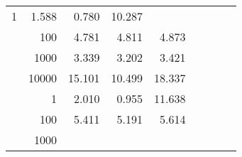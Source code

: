 \begin{table}
\begin{tabular}{rrrrrrrrr}
					\multirow{ 1 }{*}{ 1 } &
					
						
							    
							    
	                           1.588 & 0.780 & 10.287  \\
	                
	            
					 &  
					 
					\multirow{ 1 }{*}{ 100 } &
					
						
							    
							    
	                           4.781 & 4.811 & 4.873  \\
	                
	            
					 &  
					 
					\multirow{ 1 }{*}{ 1000 } &
					
						
							    
							    
	                           3.339 & 3.202 & 3.421  \\
	                
	            
					 &  
					 
					\multirow{ 1 }{*}{ 10000 } &
					
						
							    
							    
	                           15.101 & 10.499 & 18.337  \\
	                
	            
	        
				\noalign{\smallskip}\hline
				\multirow{ 4 }{*}{ 160000 } &
				
					
					 
					\multirow{ 1 }{*}{ 1 } &
					
						
							    
							    
	                           2.010 & 0.955 & 11.638  \\
	                
	            
					 &  
					 
					\multirow{ 1 }{*}{ 100 } &
					
						
							    
							    
	                           5.411 & 5.191 & 5.614  \\
	                
	            
					 &  
					 
					\multirow{ 1 }{*}{ 1000 } &
					
						
							    

\end{tabular}
\end{table}
